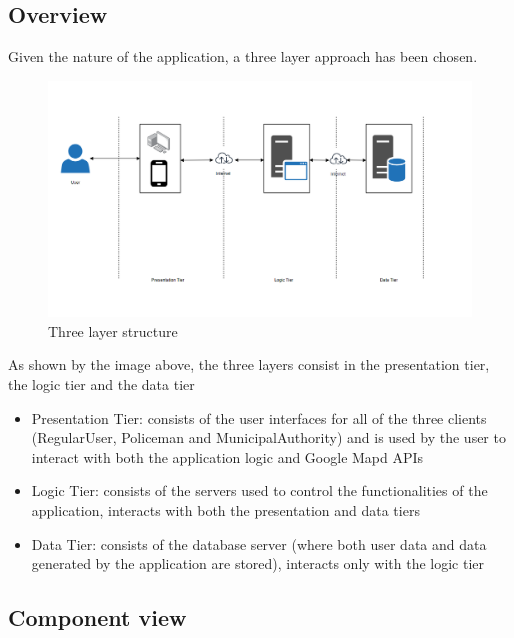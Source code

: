 \subsection{Overview}
Given the nature of the application, a three layer approach has been chosen.\newline
\begin{figure}[h!]
	\centering
	\includegraphics[width=\textwidth]{Images/three_layer}
	\caption{Three layer structure}
\end{figure}
\newline
As shown by the image above, the three layers consist in the presentation tier, the logic tier and the data tier
\begin{itemize}
\item Presentation Tier: consists of the user interfaces for all of the three clients (RegularUser, Policeman and MunicipalAuthority) and is used by the user to interact with both the application logic and Google Mapd APIs \newline
\item Logic Tier: consists of the servers used to control the functionalities of the application, interacts with both the presentation and data tiers \newline
\item Data Tier: consists of the database server (where both user data and data generated by the application are stored), interacts only with the logic tier \newline
\end{itemize}
\newpage
\subsection{Component view}

